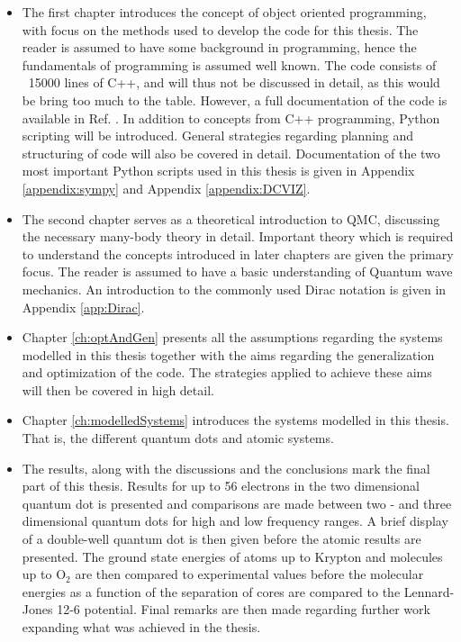 \begin{itemize}
 \item The first chapter introduces the concept of object oriented programming, with focus on the methods used to develop the code for this thesis. The reader is assumed to have some background in programming, hence the fundamentals of programming is assumed well known. The code consists of ~15000 lines of C++, and will thus not be discussed in detail, as this would be bring too much to the table. However, a full documentation of the code is available in Ref. \cite{libBorealisCode}. In addition to concepts from C++ programming, Python scripting will be introduced. General strategies regarding planning and structuring of code will also be covered in detail. Documentation of the two most important Python scripts used in this thesis is given in Appendix \ref{appendix:sympy} and Appendix \ref{appendix:DCVIZ}.
 
 \item The second chapter serves as a theoretical introduction to QMC, discussing the necessary many-body theory in detail. Important theory which is required to understand the concepts introduced in later chapters are given the primary focus. The reader is assumed to have a basic understanding of Quantum wave mechanics. An introduction to the commonly used Dirac notation is given in Appendix \ref{app:Dirac}.
 
 \item Chapter \ref{ch:optAndGen} presents all the assumptions regarding the systems modelled in this thesis together with the aims regarding the generalization and optimization of the code. The strategies applied to achieve these aims will then be covered in high detail.
 
 \item Chapter \ref{ch:modelledSystems} introduces the systems modelled in this thesis. That is, the different quantum dots and atomic systems.
 
 \item The results, along with the discussions and the conclusions mark the final part of this thesis. Results for up to 56 electrons in the two dimensional quantum dot is presented and comparisons are made between two - and three dimensional quantum dots for high and low frequency ranges. A brief display of a double-well quantum dot is then given before the atomic results are presented. The ground state energies of atoms up to Krypton and molecules up to $\mathrm{O_2}$ are then compared to experimental values before the molecular energies as a function of the separation of cores are compared to the Lennard-Jones 12-6 potential. Final remarks are then made regarding further work expanding what was achieved in the thesis. 
\end{itemize}
